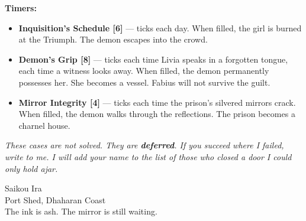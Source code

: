 \textbf{Timers:}
\begin{itemize}
  \item \textbf{Inquisition's Schedule [6]} --- ticks each day. When filled, the girl is burned at the Triumph. The demon escapes into the crowd.
  \item \textbf{Demon's Grip [8]} --- ticks each time Livia speaks in a forgotten tongue, each time a witness looks away. When filled, the demon permanently possesses her. She becomes a vessel. Fabius will not survive the guilt.
  \item \textbf{Mirror Integrity [4]} --- ticks each time the prison's silvered mirrors crack. When filled, the demon walks through the reflections. The prison becomes a charnel house.
\end{itemize}

\emph{These cases are not solved. They are \textbf{deferred}. If you succeed where I failed, write to me. I will add your name to the list of those who closed a door I could only hold ajar.}

\begin{flushright}
Saikou Ira\\
Port Shed, Dhaharan Coast\\
The ink is ash. The mirror is still waiting.
\end{flushright}